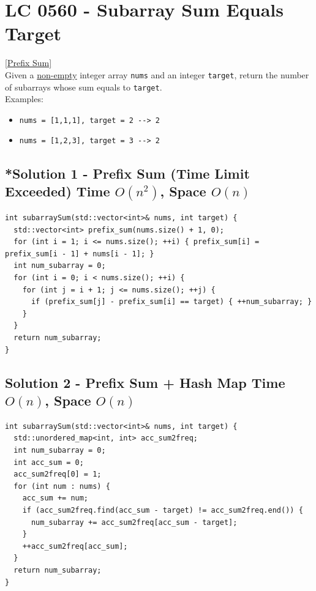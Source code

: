 \section{LC 0560 - Subarray Sum Equals Target}\label{lc0560}
\hyperref[sec:prefix_sum]{[Prefix Sum]}\\

Given a \ul{non-empty} integer array {\colorbox{CodeBackground}{\lstinline|nums|}} and an integer {\colorbox{CodeBackground}{\lstinline|target|}}, return the number of subarrays whose sum equals to {\colorbox{CodeBackground}{\lstinline|target|}}.\\

Examples:
\begin{itemize}
\item {\colorbox{CodeBackground}{\lstinline|nums = [1,1,1], target = 2 --> 2|}}
\item {\colorbox{CodeBackground}{\lstinline|nums = [1,2,3], target = 3 --> 2|}}
\end{itemize}

\subsection*{*Solution 1 - Prefix Sum (Time Limit Exceeded) {\scriptsize\color{gray}\Coffeecup\hspace{1mm}Time $O(n^2)$, Space $O(n)$}}
\begin{lstlisting}
int subarraySum(std::vector<int>& nums, int target) {
  std::vector<int> prefix_sum(nums.size() + 1, 0);
  for (int i = 1; i <= nums.size(); ++i) { prefix_sum[i] = prefix_sum[i - 1] + nums[i - 1]; }
  int num_subarray = 0;
  for (int i = 0; i < nums.size(); ++i) {
    for (int j = i + 1; j <= nums.size(); ++j) {
      if (prefix_sum[j] - prefix_sum[i] == target) { ++num_subarray; }
    }
  }
  return num_subarray;
}

\end{lstlisting}

\subsection*{Solution 2 - Prefix Sum + Hash Map {\scriptsize\color{gray}\Coffeecup\hspace{1mm}Time $O(n)$, Space $O(n)$}}
\begin{lstlisting}
int subarraySum(std::vector<int>& nums, int target) {
  std::unordered_map<int, int> acc_sum2freq;
  int num_subarray = 0;
  int acc_sum = 0;
  acc_sum2freq[0] = 1;
  for (int num : nums) {
    acc_sum += num;
    if (acc_sum2freq.find(acc_sum - target) != acc_sum2freq.end()) {
      num_subarray += acc_sum2freq[acc_sum - target];
    }
    ++acc_sum2freq[acc_sum];
  }
  return num_subarray;
}
\end{lstlisting}

